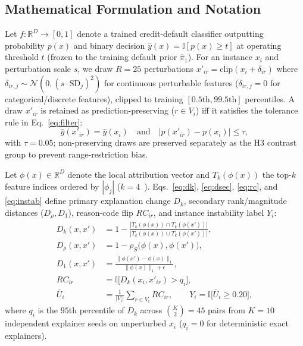 \documentclass[conference]{IEEEtran}
\begin{document}
\subsection{Mathematical Formulation and Notation}
Let $f: \mathbb{R}^D \to [0,1]$ denote a trained credit-default classifier outputting probability $p(x)$ and binary decision $\hat{y}(x) = \mathbb{I}[p(x) \ge t]$ at operating threshold $t$ (frozen to the training default prior $\hat{\pi}_1$). For an instance $x_i$ and perturbation scale $s$, we draw $R=25$ perturbations $x'_{ir} = \mathrm{clip}(x_i + \delta_{ir})$ where $\delta_{ir,j} \sim \mathcal{N}(0, (s\cdot\mathrm{SD}_j)^2)$ for continuous perturbable features ($\delta_{ir,j} = 0$ for categorical/discrete features), clipped to training $[0.5\text{th}, 99.5\text{th}]$ percentiles. A draw $x'_{ir}$ is retained as prediction-preserving ($r \in V_i$) iff it satisfies the tolerance rule in Eq.~\eqref{eq:filter}:
\begin{equation}
\label{eq:filter}
\hat{y}(x'_{ir}) = \hat{y}(x_i) \quad \text{and} \quad |p(x'_{ir}) - p(x_i)| \le \tau,
\end{equation}
with $\tau = 0.05$; non-preserving draws are preserved separately as the H3 contrast group to prevent range-restriction bias.

Let $\phi(x) \in \mathbb{R}^D$ denote the local attribution vector and $T_k(\phi(x))$ the top-$k$ feature indices ordered by $|\phi_j|$ ($k=4$~\cite{regb_cfpb}). Eqs.~\eqref{eq:dk}, \eqref{eq:dsec}, \eqref{eq:rc}, and \eqref{eq:instab} define primary explanation change $D_k$, secondary rank/magnitude distances ($D_\rho, D_1$), reason-code flip $RC_{ir}$, and instance instability label $Y_i$:
\begin{align}
D_k(x, x') &= 1 - \frac{|T_k(\phi(x)) \cap T_k(\phi(x'))|}{|T_k(\phi(x)) \cup T_k(\phi(x'))|}, \label{eq:dk} \\
D_\rho(x, x') &= 1 - \rho_S\big(\phi(x), \phi(x')\big), \nonumber \\
D_1(x, x') &= \frac{\|\phi(x') - \phi(x)\|_1}{\|\phi(x)\|_1 + \epsilon}, \label{eq:dsec} \\
RC_{ir} &= \mathbb{I}\big[D_k(x_i, x'_{ir}) > q_i\big], \label{eq:rc} \\
\bar{U}_i &= \frac{1}{|V_i|} \sum_{r \in V_i} RC_{ir}, \qquad
Y_i = \mathbb{I}\big[\bar{U}_i \ge 0.20\big], \label{eq:instab}
\end{align}
where $q_i$ is the $95$th percentile of $D_k$ across $\binom{K}{2}=45$ pairs from $K=10$ independent explainer seeds on unperturbed $x_i$ ($q_i=0$ for deterministic exact explainers).
\end{document}
